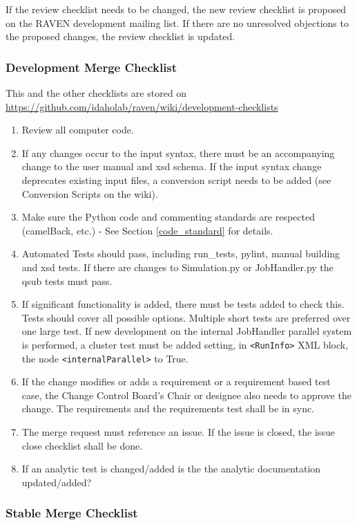 \documentclass{article}
\begin{document}
If the review checklist needs to be changed, the new review checklist
is proposed on the RAVEN development mailing list.  If there are no
unresolved objections to the proposed changes, the review checklist is
updated.

\subsubsection{Development Merge Checklist}

This and the other checklists are stored on  \url{https://github.com/idaholab/raven/wiki/development-checklists}


\begin{enumerate}
\item Review all computer code.
\item If any changes occur to the input syntax, there must be an accompanying change to the user manual and xsd schema. If the input syntax change deprecates existing input files, a conversion script needs to be added (see Conversion Scripts on the wiki).
\item Make sure the Python code and commenting standards are respected (camelBack, etc.) - See Section \ref{code_standard} for details.
\item Automated Tests should pass, including run\_tests, pylint, manual building and xsd tests. If there are changes to Simulation.py or JobHandler.py the qsub tests must pass.
\item If significant functionality is added, there must  be tests added to check this. Tests should cover all possible options.  Multiple short tests are preferred over one large test. If new development on the internal JobHandler parallel system is performed, a cluster test must be added setting, in \verb'<RunInfo>' XML block, the node \verb'<internalParallel>' to True.
\item If the change modifies or adds a requirement or a requirement based test case, the Change Control Board's Chair or designee also needs to approve the change.  The requirements and the requirements test shall be in sync.
\item The merge request must reference an issue.  If the issue is closed, the issue close checklist shall be done.
\item If an analytic test is changed/added is the the analytic documentation updated/added?
\end{enumerate}

\subsubsection{Stable Merge Checklist}
\end{document}
